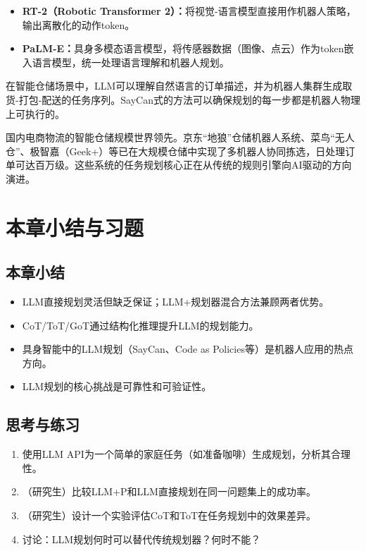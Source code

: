 \begin{itemize}
  \item \textbf{RT-2（Robotic Transformer 2）：}将视觉-语言模型直接用作机器人策略，输出离散化的动作token。
  \item \textbf{PaLM-E：}具身多模态语言模型，将传感器数据（图像、点云）作为token嵌入语言模型，统一处理语言理解和机器人规划。
\end{itemize}

\begin{appbox}[title={\textbf{应用：智能仓储中的任务规划}}]
在智能仓储场景中，LLM可以理解自然语言的订单描述，并为机器人集群生成取货-打包-配送的任务序列。SayCan式的方法可以确保规划的每一步都是机器人物理上可执行的。

国内电商物流的智能仓储规模世界领先。京东``地狼''仓储机器人系统、菜鸟``无人仓''、极智嘉（Geek+）等已在大规模仓储中实现了多机器人协同拣选，日处理订单可达百万级。这些系统的任务规划核心正在从传统的规则引擎向AI驱动的方向演进。
\end{appbox}

\section{本章小结与习题}

\subsection*{本章小结}
\begin{itemize}
  \item LLM直接规划灵活但缺乏保证；LLM+规划器混合方法兼顾两者优势。
  \item CoT/ToT/GoT通过结构化推理提升LLM的规划能力。
  \item 具身智能中的LLM规划（SayCan、Code as Policies等）是机器人应用的热点方向。
  \item LLM规划的核心挑战是可靠性和可验证性。
\end{itemize}

\subsection*{思考与练习}
\begin{enumerate}
  \item 使用LLM API为一个简单的家庭任务（如准备咖啡）生成规划，分析其合理性。
  \item （研究生）比较LLM+P和LLM直接规划在同一问题集上的成功率。
  \item （研究生）设计一个实验评估CoT和ToT在任务规划中的效果差异。
  \item 讨论：LLM规划何时可以替代传统规划器？何时不能？
\end{enumerate}
